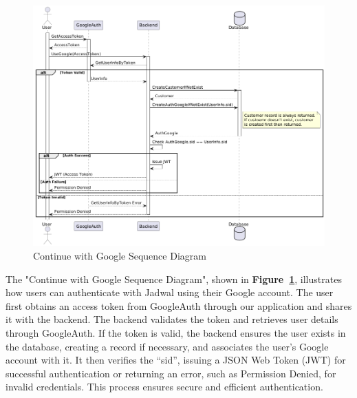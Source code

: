 \begin{figure}[!h]
  \centering
  \includegraphics[width=\textwidth]{images/docs/diagrams/sequence-diagrams/all-sequence-diagrams/Continue with Google.png}
  \caption{Continue with Google Sequence Diagram}
  \label{fig:seq/continue-with-google}
\end{figure}

The "Continue with Google Sequence Diagram", shown in \textbf{Figure~\ref{fig:seq/continue-with-google}}, illustrates how users can authenticate with Jadwal using their Google account. The user first obtains an access token from GoogleAuth through our application and shares it with the backend. The backend validates the token and retrieves user details through GoogleAuth. If the token is valid, the backend ensures the user exists in the database, creating a record if necessary, and associates the user’s Google account with it. It then verifies the ``sid'', issuing a JSON Web Token (JWT) for successful authentication or returning an error, such as Permission Denied, for invalid credentials. This process ensures secure and efficient authentication.